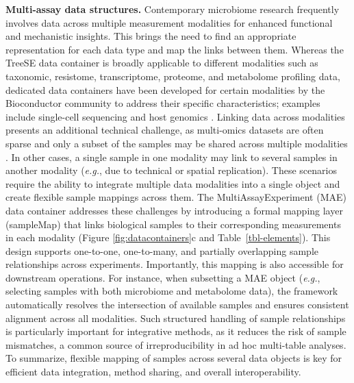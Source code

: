 \documentclass[
  sn-nature,
]{sn-jnl}
\begin{document}
\textbf{Multi-assay data structures.} Contemporary microbiome research
frequently involves data across multiple measurement modalities for
enhanced functional and mechanistic insights. This brings the need to
find an appropriate representation for each data type and map the links
between them. Whereas the TreeSE data container is broadly applicable to
different modalities such as taxonomic, resistome, transcriptome,
proteome, and metabolome profiling data, dedicated data containers have
been developed for certain modalities by the Bioconductor community to
address their specific characteristics; examples include single-cell
sequencing \citep{amezquita2020} and host genomics \citep{lawrence2013}.
Linking data across modalities presents an additional technical
challenge, as multi-omics datasets are often sparse and only a subset of
the samples may be shared across multiple modalities
\citep{sherwani2025}. In other cases, a single sample in one modality
may link to several samples in another modality \citep{husso2023}
(\emph{e.g.}, due to technical or spatial replication). These scenarios
require the ability to integrate multiple data modalities into a single
object and create flexible sample mappings across them. The
MultiAssayExperiment (MAE) data container \citep{ramos2017} addresses
these challenges by introducing a formal mapping layer (sampleMap) that
links biological samples to their corresponding measurements in each
modality (Figure \ref{fig:datacontainers}c and
Table~\ref{tbl-elements}). This design supports one-to-one, one-to-many,
and partially overlapping sample relationships across experiments.
Importantly, this mapping is also accessible for downstream operations.
For instance, when subsetting a MAE object (\emph{e.g.}, selecting
samples with both microbiome and metabolome data), the framework
automatically resolves the intersection of available samples and ensures
consistent alignment across all modalities. Such structured handling of
sample relationships is particularly important for integrative methods,
as it reduces the risk of sample mismatches, a common source of
irreproducibility in ad hoc multi-table analyses. To summarize, flexible
mapping of samples across several data objects is key for efficient data
integration, method sharing, and overall interoperability.
\end{document}
